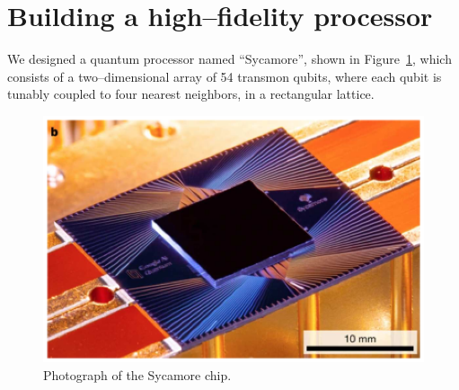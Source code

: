 \section{Building a high--fidelity processor}
\label{sec:processor}
%
%
We designed a quantum processor named ``Sycamore'', shown in
Figure~\ref{fig:sycamore_processor}, which consists of a two--dimensional array
of 54 transmon qubits, where each qubit is tunably coupled to four nearest
neighbors, in a rectangular lattice.

%
%
%
%
%
%
%
%
\begin{figure}[t]
  \centering
  \includegraphics[scale=0.8]{img/sycamore.ps}
  \caption{Photograph of the Sycamore chip.}
  \label{fig:sycamore_processor}
\end{figure}

